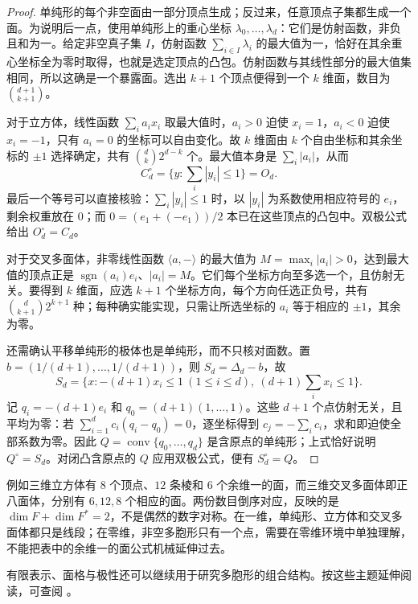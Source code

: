 \begin{proof}
	单纯形的每个非空面由一部分顶点生成；反过来，任意顶点子集都生成一个面。为说明后一点，使用单纯形上的重心坐标 \(\lambda_0,\ldots,\lambda_d\)：它们是仿射函数，非负且和为一。给定非空真子集 \(I\)，仿射函数 \(\sum_{i\in I}\lambda_i\) 的最大值为一，恰好在其余重心坐标全为零时取得，也就是选定顶点的凸包。仿射函数与其线性部分的最大值集相同，所以这确是一个暴露面。选出 \(k+1\) 个顶点便得到一个 \(k\) 维面，数目为 \(\binom{d+1}{k+1}\)。

	对于立方体，线性函数 \(\sum_i a_ix_i\) 取最大值时，\(a_i>0\) 迫使 \(x_i=1\)，\(a_i<0\) 迫使 \(x_i=-1\)，只有 \(a_i=0\) 的坐标可以自由变化。故 \(k\) 维面由 \(k\) 个自由坐标和其余坐标的 \(\pm1\) 选择确定，共有 \(\binom dk2^{d-k}\) 个。最大值本身是 \(\sum_i|a_i|\)，从而
	\[
		C_d^\circ=\{y:\textstyle\sum_i|y_i|\le1\}=O_d.
	\]
	最后一个等号可以直接核验：\(\sum_i|y_i|\le1\) 时，以 \(|y_i|\) 为系数使用相应符号的 \(e_i\)，剩余权重放在 \(0\)；而 \(0=(e_1+(-e_1))/2\) 本已在这些顶点的凸包中。双极公式给出 \(O_d^\circ=C_d\)。

	对于交叉多面体，非零线性函数 \(\langle a,-\rangle\) 的最大值为 \(M=\max_i|a_i|>0\)，达到最大值的顶点正是 \(\operatorname{sgn}(a_i)e_i\)、\(|a_i|=M\)。它们每个坐标方向至多选一个，且仿射无关。要得到 \(k\) 维面，应选 \(k+1\) 个坐标方向，每个方向任选正负号，共有 \(\binom d{k+1}2^{k+1}\) 种；每种确实能实现，只需让所选坐标的 \(a_i\) 等于相应的 \(\pm1\)，其余为零。

	还需确认平移单纯形的极体也是单纯形，而不只核对面数。置 \(b=(1/(d+1),\ldots,1/(d+1))\)，则 \(S_d=\Delta_d-b\)，故
	\[
		S_d=\{x:-(d+1)x_i\le1\ (1\le i\le d),\ (d+1)\textstyle\sum_i x_i\le1\}.
	\]
	记 \(q_i=-(d+1)e_i\) 和 \(q_0=(d+1)(1,\ldots,1)\)。这些 \(d+1\) 个点仿射无关，且平均为零：若 \(\sum_{i=1}^d c_i(q_i-q_0)=0\)，逐坐标得到 \(c_j=-\sum_i c_i\)，求和即迫使全部系数为零。因此 \(Q=\operatorname{conv}\{q_0,\ldots,q_d\}\) 是含原点的单纯形；上式恰好说明 \(Q^\circ=S_d\)。对闭凸含原点的 \(Q\) 应用双极公式，便有 \(S_d^\circ=Q\)。
\end{proof}

例如三维立方体有 \(8\) 个顶点、\(12\) 条棱和 \(6\) 个余维一的面，而三维交叉多面体即正八面体，分别有 \(6,12,8\) 个相应的面。两份数目倒序对应，反映的是 \(\dim F+\dim F^*=2\)，不是偶然的数字对称。在一维，单纯形、立方体和交叉多面体都只是线段；在零维，非空多胞形只有一个点，需要在零维环境中单独理解，不能把表中的余维一的面公式机械延伸过去。

有限表示、面格与极性还可以继续用于研究多胞形的组合结构。按这些主题延伸阅读，可查阅 \cite[第1.1, 2.1--2.4节]{Ziegler1995}。
